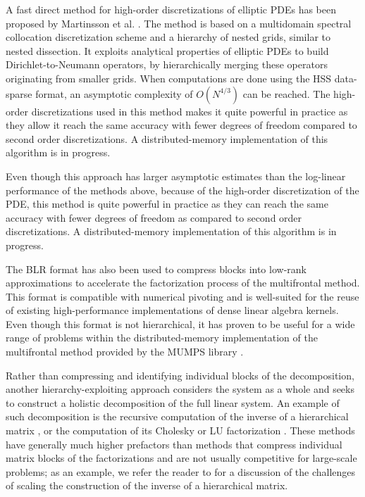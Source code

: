 \documentclass[]{elsarticle}
\begin{document}
A fast direct method for high-order discretizations of elliptic PDEs has been proposed by Martinsson et al. \cite{Martinsson2013460,gillman2014direct,Hao2016419}. The method is based on a multidomain spectral collocation discretization scheme and a hierarchy of nested grids, similar to nested dissection. It exploits analytical properties of elliptic PDEs to build Dirichlet-to-Neumann operators, by hierarchically merging these operators originating from smaller grids. When computations are done using the HSS data-sparse format, an asymptotic complexity of $O(N^{4/3})$ can be reached. The high-order discretizations used in this method makes it quite powerful in practice as they allow it reach the same accuracy with fewer degrees of freedom compared to second order discretizations. A distributed-memory implementation of this algorithm is in progress.

Even though this approach has larger asymptotic estimates than the log-linear performance of the methods above, because of the high-order discretization of the PDE, this method is quite powerful in practice as they can reach the same accuracy with fewer degrees of freedom as compared to second order discretizations. A distributed-memory implementation of this algorithm is in progress.

The BLR format \cite{weisbecker2013improving} has also been used to compress blocks into low-rank approximations to accelerate the factorization process of the multifrontal method. This format is compatible with numerical pivoting and is well-suited for the reuse of existing high-performance implementations of dense linear algebra kernels. Even though this format is not hierarchical, it has proven to be useful for a wide range of problems \cite{amestoy2015improving} within the distributed-memory implementation of the multifrontal method provided by the MUMPS library \cite{MUMPS1,MUMPS2}.

Rather than compressing and identifying individual blocks of the decomposition, another hierarchy-exploiting approach considers the system as a whole and seeks to construct a holistic decomposition of the full linear system. An example of such decomposition is the recursive computation of the inverse of a hierarchical matrix \cite{Izadi2012,Ambikasaran2013}, or the computation of its Cholesky or LU factorization \cite{ibra07,blackBoxHLU08}. These methods have generally much higher prefactors than methods that compress individual matrix blocks of the factorizations and are not usually competitive for large-scale problems; as an example, we refer the reader to \cite{Izadi2012} for a discussion of the challenges of scaling the construction of the inverse of a hierarchical matrix.
\end{document}
